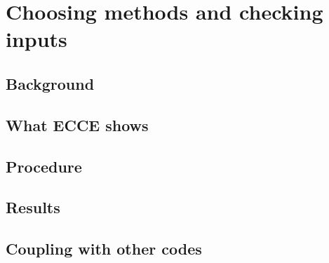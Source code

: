 \chapter{Choosing methods and checking inputs}
\label{ch:methods-choice}

\section{Background}

\section{What ECCE shows}

\section{Procedure}

\section{Results}

\section{Coupling with other codes}


